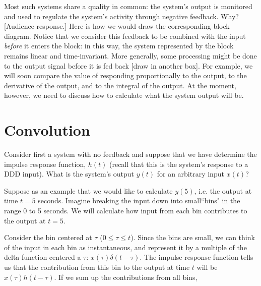 \documentclass{article}
\begin{document}
Most such systems share a quality in common: the system's output is monitored and used to regulate the system's activity through negative feedback. Why? [Audience response.] Here is how we would draw the corresponding block diagram. Notice that we consider this feedback to be combined with the input \textit{before} it enters the block: in this way, the system represented by the block remains linear and time-invariant. More generally, some processing might be done to the output signal before it is fed back [draw in another box]. For example, we will soon compare the value of responding proportionally to the output, to the derivative of the output, and to the integral of the output. At the moment, however, we need to discuss how to calculate what the system output will be.


\section*{Convolution}

Consider first a system with no feedback and suppose that we have determine the impulse response function, $h(t)$ (recall that this is the system's response to a DDD input). What is the system's output $y(t)$ for an arbitrary input $x(t)$?

Suppose as an example that we would like to calculate $y(5)$, i.e. the output at time $t=5$ seconds. Imagine breaking the input down into small``bins" in the range 0 to 5 seconds. We will calculate how input from each bin contributes to the output at $t=5$.

Consider the bin centered at $\tau$ ($0 \leq \tau \leq t$). Since the bins are small, we can think of the input in each bin as instantaneous, and represent it by a multiple of the delta function centered a $\tau$: $x(\tau)\delta(t-\tau)$. The impulse response function tells us that the contribution from this bin to the output at time $t$ will be $x(\tau)h(t-\tau)$. If we sum up the contributions from all bins, 
\end{document}
